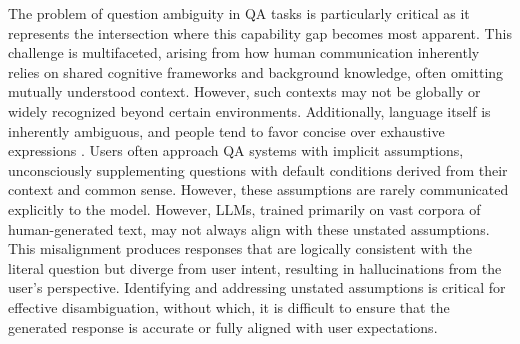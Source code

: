 The problem of question ambiguity in QA tasks is particularly critical as it represents the intersection where this capability gap becomes most apparent. This challenge is multifaceted, arising from how human communication inherently relies on shared cognitive frameworks and background knowledge, often omitting mutually understood context. However, such contexts may not be globally or widely recognized beyond certain environments. Additionally, language itself is inherently ambiguous, and people tend to favor concise over exhaustive expressions \cite{wasow2005puzzle}. %
Users often approach QA systems with implicit assumptions, unconsciously supplementing questions with default conditions derived from their context and common sense. However, these assumptions are rarely communicated explicitly to the model. However, LLMs, trained primarily on vast corpora of human-generated text, may not always align with these unstated assumptions. %
This misalignment produces responses that are logically consistent with the literal question but diverge from user intent, resulting in hallucinations from the user's perspective.
Identifying and addressing unstated assumptions is critical for effective disambiguation, without which, it is difficult to ensure that the generated response is accurate or fully aligned with user expectations. %
